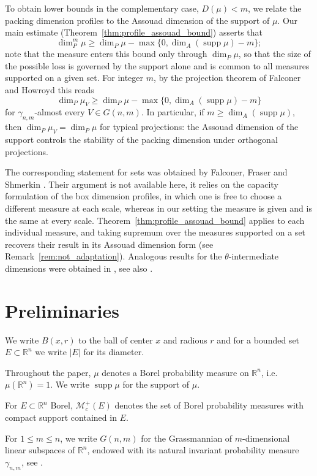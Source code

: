 \documentclass[12pt]{amsart}
\DeclareMathOperator{\supp}{supp}
\theoremstyle{definition}
\theoremstyle{remark}
\numberwithin{equation}{section}
\begin{document}
To obtain lower bounds in the complementary case, $D(\mu)<m$, we relate
the packing dimension profiles to the Assouad dimension of the support of
$\mu$. Our main estimate (Theorem~\ref{thm:profile_assouad_bound})
asserts that
\[
\dim_P^m \mu \ge \dim_P \mu - \max\{0,\dim_A(\supp\mu)-m\};
\]
note that the measure enters this bound only through $\dim_P\mu$, so that
the size of the possible loss is governed by the support alone and is
common to all measures supported on a given set. For integer $m$, by the
projection theorem of Falconer and Howroyd this reads
\[
\dim_P \mu_V \ge \dim_P \mu - \max\{0,\dim_A(\supp\mu)-m\}
\]
for $\gamma_{n,m}$-almost every $V\in G(n,m)$. In particular, if
$m\ge \dim_A(\supp\mu)$, then $\dim_P \mu_V=\dim_P\mu$ for typical
projections: the Assouad dimension of the support controls the stability
of the packing dimension under orthogonal projections.

The corresponding statement for sets was obtained by Falconer, Fraser and
Shmerkin \cite{falconer2021assouad}. Their argument is not available here, it relies on the
capacity formulation of the box dimension profiles, in which one is free
to choose a different measure at each scale, whereas in our setting the
measure is given and is the same at every scale.
Theorem~\ref{thm:profile_assouad_bound} applies to each individual measure, and taking
supremum over the measures supported on a set recovers their result in its
Assouad dimension form (see Remark~\ref{rem:not_adaptation}). Analogous
results for the $\theta$-intermediate dimensions were obtained in
\cite{AngeliniMolter2025}, see also \cite{ANGELINI2026130039}.




\section{Preliminaries}

We write $B(x,r)$ to the ball of center $x$ and radious $r$ and for a bounded set $E\subset \mathbb{R}^n$ we write $|E|$ for its diameter.

Throughout the paper, $\mu$ denotes a Borel probability measure on $\mathbb{R}^n$, i.e. $\mu(\mathbb{R}^n)=1$. We write $\supp \mu$ for the support of $\mu$.

For $E\subset\mathbb{R}^n$ Borel, $\mathcal{M}_c^+(E)$ denotes the set of
Borel probability measures with compact support contained in $E$.

For $1\le m\le n$, we write $G(n,m)$ for the Grassmannian of $m$-dimensional linear subspaces of $\mathbb{R}^n$,
endowed with its natural invariant probability measure $\gamma_{n,m}$, see \cite[Chapter 3]{mattila1999geometry}.
\end{document}
